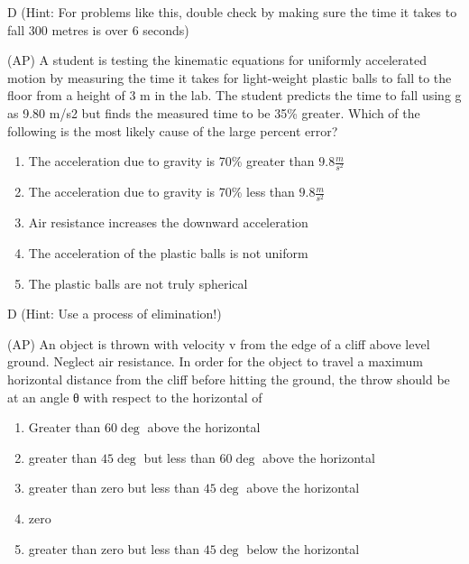 \begin{solution}
D (Hint: For problems like this, double check by making sure the time it takes to fall 300 metres is over 6 seconds)
\end{solution}

\newpage
\begin{question}
(AP) A student is testing the kinematic equations for uniformly accelerated motion by measuring the time it takes for light-weight plastic balls to fall to the floor from a height of 3 m in the lab. The student predicts the time to fall using g as 9.80 m/s2 but finds the measured time to be 35\% greater. Which of the following is the most likely cause of the large percent error?   

\begin{enumerate}[label=(\alph*)]
    \item The acceleration due to gravity is 70\% greater than $9.8\frac{m}{s^2}$
    \item The acceleration due to gravity is 70\% less than $9.8\frac{m}{s^2}$
    \item Air resistance increases the downward acceleration
    \item The acceleration of the plastic balls is not uniform
    \item The plastic balls are not truly spherical
\end{enumerate}

\end{question}

\begin{solution}
D (Hint: Use a process of elimination!)
\end{solution}


\begin{question}
(AP) An object is thrown with velocity v from the edge of a cliff above level ground. Neglect air resistance. In order for the object to travel a maximum horizontal distance from the cliff before hitting the ground, the throw should be at an angle θ with respect to the horizontal of

\begin{enumerate}[label=(\alph*)]
    \item Greater than $60\deg$ above the horizontal
    \item greater than $45\deg$ but less than $60\deg$ above the horizontal
    \item greater than zero but less than $45\deg$ above the horizontal
    \item zero
    \item greater than zero but less than $45\deg$ below the horizontal
\end{enumerate}

\end{question}

